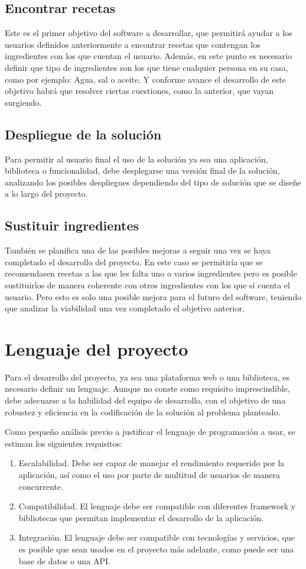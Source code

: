 \subsection{Encontrar recetas}
Este es el primer objetivo del software a desarrollar, que permitirá ayudar a los usuarios definidos anteriormente a encontrar recetas que contengan los ingredientes con los que cuentan el usuario. Además, en este punto es necesario definir que tipo de ingredientes son los que tiene cualquier persona en su casa, como por ejemplo: Agua, sal o aceite. Y conforme avance el desarrollo de este objetivo habrá que resolver ciertas cuestiones, como la anterior, que vayan surgiendo. 

\subsection{Despliegue de la solución}
Para permitir al usuario final el uso de la solución ya sea una aplicación, biblioteca o funcionalidad, debe desplegarse una versión final de la solución, analizando los posibles despliegues dependiendo del tipo de solución que se diseñe a lo largo del proyecto.

\subsection{Sustituir ingredientes}
También se planifica una de las posibles mejoras a seguir una vez se haya completado el desarrollo del proyecto. En este caso se permitiría que se recomendasen recetas a las que les falta uno o varios ingredientes pero es posible sustituirlos de manera coherente con otros ingredientes con los que sí cuenta el usuario. Pero esto es solo una posible mejora para el futuro del software, teniendo que analizar la viabilidad una vez completado el objetivo anterior. 

\section{Lenguaje del proyecto}
Para el desarrollo del proyecto, ya sea una plataforma web o una biblioteca, es necesario definir un lenguaje. Aunque no conste como requisito imprescindible, debe adecuarse a la habilidad del equipo de desarrollo, con el objetivo de una robustez y eficiencia en la codificación de la solución al problema planteado. 

Como pequeño análisis previo a justificar el lenguaje de programación a usar, se estiman los siguientes requisitos:
\begin{enumerate}
    \item Escalabilidad. Debe ser capaz de manejar el rendimiento requerido por la aplicación, así como el uso por parte de multitud de usuarios de manera concurrente.
    \item Compatibilidad. El lenguaje debe ser compatible con diferentes \gls{framework} y bibliotecas que permitan implementar el desarrollo de la aplicación. 
    \item Integración. El lenguaje debe ser compatible con tecnologías y servicios, que es posible que sean usados en el proyecto más adelante, como puede ser una base de datos o una \gls{API}.
\end{enumerate}

